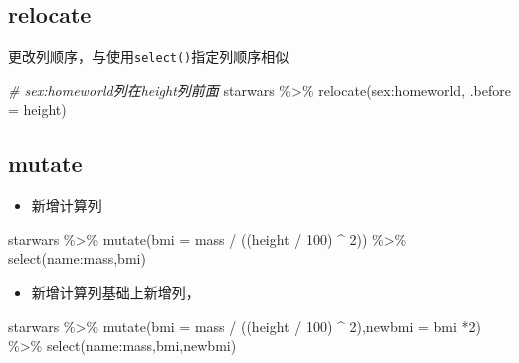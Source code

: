\documentclass[
]{book}
\newenvironment{Shaded}{\begin{snugshade}}{\end{snugshade}}
\newcommand{\AttributeTok}[1]{\textcolor[rgb]{0.77,0.63,0.00}{#1}}
\newcommand{\CommentTok}[1]{\textcolor[rgb]{0.56,0.35,0.01}{\textit{#1}}}
\newcommand{\DecValTok}[1]{\textcolor[rgb]{0.00,0.00,0.81}{#1}}
\newcommand{\FunctionTok}[1]{\textcolor[rgb]{0.00,0.00,0.00}{#1}}
\newcommand{\NormalTok}[1]{#1}
\newcommand{\SpecialCharTok}[1]{\textcolor[rgb]{0.00,0.00,0.00}{#1}}
\providecommand{\tightlist}{%
  \setlength{\itemsep}{0pt}\setlength{\parskip}{0pt}}
\begin{document}
\hypertarget{relocate}{%
\subsection{relocate}\label{relocate}}

更改列顺序，与使用\texttt{select()}指定列顺序相似

\begin{Shaded}
\begin{Highlighting}[]
\CommentTok{\# sex:homeworld列在height列前面}
\NormalTok{starwars }\SpecialCharTok{\%\textgreater{}\%} \FunctionTok{relocate}\NormalTok{(sex}\SpecialCharTok{:}\NormalTok{homeworld, }\AttributeTok{.before =}\NormalTok{ height)}
\end{Highlighting}
\end{Shaded}

\hypertarget{mutate}{%
\subsection{mutate}\label{mutate}}

\begin{itemize}
\tightlist
\item
  新增计算列
\end{itemize}

\begin{Shaded}
\begin{Highlighting}[]
\NormalTok{starwars }\SpecialCharTok{\%\textgreater{}\%} 
  \FunctionTok{mutate}\NormalTok{(}\AttributeTok{bmi =}\NormalTok{ mass }\SpecialCharTok{/}\NormalTok{ ((height }\SpecialCharTok{/} \DecValTok{100}\NormalTok{)  }\SpecialCharTok{\^{}} \DecValTok{2}\NormalTok{)) }\SpecialCharTok{\%\textgreater{}\%} 
  \FunctionTok{select}\NormalTok{(name}\SpecialCharTok{:}\NormalTok{mass,bmi)}
\end{Highlighting}
\end{Shaded}

\begin{itemize}
\tightlist
\item
  新增计算列基础上新增列，
\end{itemize}

\begin{Shaded}
\begin{Highlighting}[]
\NormalTok{starwars }\SpecialCharTok{\%\textgreater{}\%} 
  \FunctionTok{mutate}\NormalTok{(}\AttributeTok{bmi =}\NormalTok{ mass }\SpecialCharTok{/}\NormalTok{ ((height }\SpecialCharTok{/} \DecValTok{100}\NormalTok{)  }\SpecialCharTok{\^{}} \DecValTok{2}\NormalTok{),}\AttributeTok{newbmi =}\NormalTok{ bmi }\SpecialCharTok{*}\DecValTok{2}\NormalTok{) }\SpecialCharTok{\%\textgreater{}\%} 
  \FunctionTok{select}\NormalTok{(name}\SpecialCharTok{:}\NormalTok{mass,bmi,newbmi)}
\end{Highlighting}
\end{Shaded}
\end{document}
